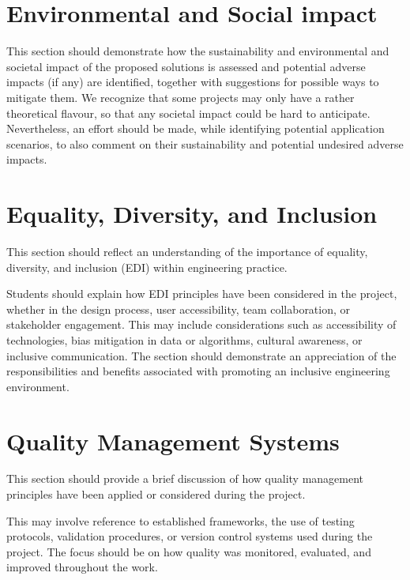 \section{Environmental and Social impact}


This section should demonstrate how the sustainability and environmental and societal impact of the proposed solutions is assessed and potential adverse impacts (if any) are identified, together with suggestions for possible ways to mitigate them. 
We recognize that some projects may only have a rather theoretical flavour, so that any societal impact could be hard to anticipate. Nevertheless, an effort should be made, while identifying potential application scenarios, to also comment on their sustainability and potential undesired adverse impacts.



\section{Equality, Diversity, and Inclusion}

This section should reflect an understanding of the importance of equality, diversity, and inclusion (EDI) within engineering practice.


Students should explain how EDI principles have been considered in the project, whether in the design process, user accessibility, team collaboration, or stakeholder engagement. This may include considerations such as accessibility of technologies, bias mitigation in data or algorithms, cultural awareness, or inclusive communication. The section should demonstrate an appreciation of the responsibilities and benefits associated with promoting an inclusive engineering environment.

\section{Quality Management Systems}

This section should provide a brief discussion of how quality management principles have been applied or considered during the project.

This may involve reference to established frameworks, the use of testing protocols, validation procedures, or version control systems used during the project. The focus should be on how quality was monitored, evaluated, and improved throughout the work.